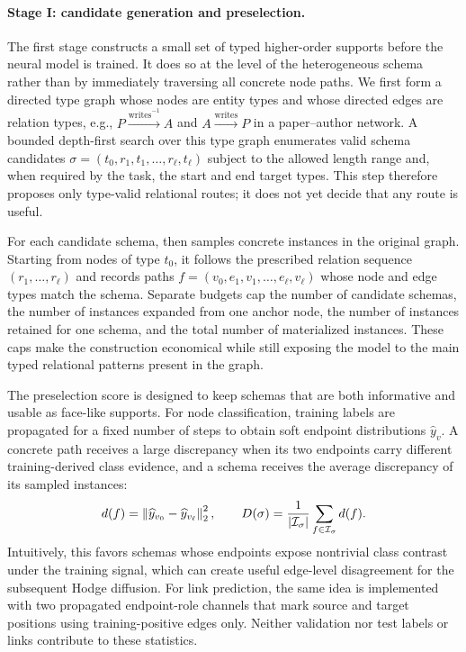 \paragraph{Stage I: candidate generation and preselection.}
The first stage constructs a small set of typed higher-order supports before the neural model is
trained.  It does so at the level of the heterogeneous schema rather than by immediately traversing
all concrete node paths.  We first form a directed type graph whose nodes are entity types and whose
directed edges are relation types, e.g., \(P\xrightarrow{\mathrm{writes}^{-1}}A\) and
\(A\xrightarrow{\mathrm{writes}}P\) in a paper--author network.  A bounded depth-first search over
this type graph enumerates valid schema candidates
\(\sigma=(t_0,r_1,t_1,\ldots,r_\ell,t_\ell)\) subject to the allowed length range and, when
required by the task, the start and end target types.  This step therefore proposes only type-valid
relational routes; it does not yet decide that any route is useful.

For each candidate schema, \ampss{} then samples concrete instances in the original graph.  Starting
from nodes of type \(t_0\), it follows the prescribed relation sequence
\((r_1,\ldots,r_\ell)\) and records paths
\(f=(v_0,e_1,v_1,\ldots,e_\ell,v_\ell)\) whose node and edge types match the schema.  Separate
budgets cap the number of candidate schemas, the number of instances expanded from one anchor node,
the number of instances retained for one schema, and the total number of materialized instances.
These caps make the construction economical while still exposing the model to the main typed
relational patterns present in the graph.

The preselection score is designed to keep schemas that are both informative and usable as
face-like supports.  For node classification, training labels are propagated for a fixed number of
steps to obtain soft endpoint distributions \(\widehat y_v\).  A concrete path receives a large
discrepancy when its two endpoints carry different training-derived class evidence, and a schema
receives the average discrepancy of its sampled instances:
\begin{equation}
  d(f)=\left\lVert \widehat y_{v_0}-\widehat y_{v_\ell}\right\rVert_2^2,
  \qquad
  D(\sigma)=\frac{1}{|\mathcal{I}_{\sigma}|}
  \sum_{f\in\mathcal{I}_{\sigma}}d(f).
  \label{eq:discrepancy}
\end{equation}
Intuitively, this favors schemas whose endpoints expose nontrivial class contrast under the
training signal, which can create useful edge-level disagreement for the subsequent Hodge diffusion.
For link prediction, the same idea is implemented with two propagated endpoint-role channels that
mark source and target positions using training-positive edges only.  Neither validation nor test
labels or links contribute to these statistics.

